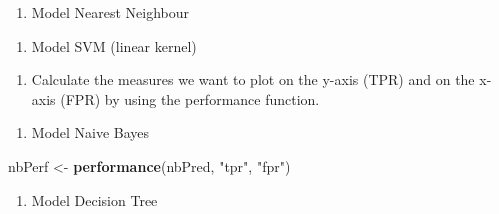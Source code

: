 \documentclass[]{article}
\newenvironment{Shaded}{\begin{snugshade}}{\end{snugshade}}
\newcommand{\KeywordTok}[1]{\textcolor[rgb]{0.13,0.29,0.53}{\textbf{#1}}}
\newcommand{\NormalTok}[1]{#1}
\newcommand{\OperatorTok}[1]{\textcolor[rgb]{0.81,0.36,0.00}{\textbf{#1}}}
\newcommand{\StringTok}[1]{\textcolor[rgb]{0.31,0.60,0.02}{#1}}
\providecommand{\tightlist}{%
  \setlength{\itemsep}{0pt}\setlength{\parskip}{0pt}}
\begin{document}
\begin{enumerate}
\def\labelenumi{\arabic{enumi}.}
\setcounter{enumi}{3}
\tightlist
\item
  Model Nearest Neighbour
\end{enumerate}

\begin{Shaded}
\end{Shaded}

\begin{enumerate}
\def\labelenumi{\arabic{enumi}.}
\setcounter{enumi}{4}
\tightlist
\item
  Model SVM (linear kernel)
\end{enumerate}

\begin{Shaded}
\end{Shaded}

\begin{enumerate}
\def\labelenumi{\alph{enumi})}
\setcounter{enumi}{2}
\tightlist
\item
  Calculate the measures we want to plot on the y-axis (TPR) and on the
  x-axis (FPR) by using the performance function.
\end{enumerate}

\begin{enumerate}
\def\labelenumi{\arabic{enumi}.}
\tightlist
\item
  Model Naive Bayes
\end{enumerate}

\begin{Shaded}
\begin{Highlighting}[]
\NormalTok{nbPerf <-}\StringTok{ }\KeywordTok{performance}\NormalTok{(nbPred, }\StringTok{"tpr"}\NormalTok{, }\StringTok{"fpr"}\NormalTok{)}
\end{Highlighting}
\end{Shaded}

\begin{enumerate}
\def\labelenumi{\arabic{enumi}.}
\setcounter{enumi}{1}
\tightlist
\item
  Model Decision Tree
\end{enumerate}
\end{document}
